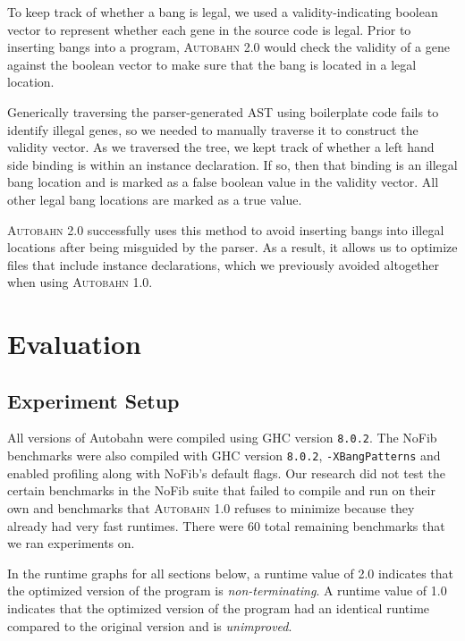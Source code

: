 \documentclass[format=sigplan, review=true]{acmart}
\newcommand{\Ao}[0]{\textsc{Autobahn 1.0}}
\newcommand{\At}[0]{\textsc{Autobahn 2.0}}
\newcommand{\nonterm}[0]{non-terminating}
\newcommand{\unimp}[0]{unimproved}
\begin{document}
To keep track of whether a bang is legal, we used a validity-indicating boolean vector to represent whether each gene in the source code is legal. Prior to inserting bangs into a program, \At{} would check the validity of a gene against the boolean vector to make sure that the bang is located in a legal location.

Generically traversing the parser-generated AST using boilerplate code fails to identify illegal genes, so we needed to manually traverse it to construct the validity vector. As we traversed the tree, we kept track of whether a left hand side binding is within an instance declaration. If so, then that binding is an illegal bang location and is marked as a false boolean value in the validity vector. All other legal bang locations are marked as a true value.

\At{} successfully uses this method to avoid inserting bangs into illegal locations after being misguided by the parser. As a result, it allows us to optimize files that include instance declarations, which we previously avoided altogether when using \Ao{}. 

\section{Evaluation}

\subsection{Experiment Setup}

All versions of Autobahn were compiled using GHC version \texttt{8.0.2}. The NoFib benchmarks were also compiled with GHC version \texttt{8.0.2}, \texttt{-XBangPatterns} and enabled profiling along with NoFib's default flags. Our research did not test the certain benchmarks in the NoFib suite that failed to compile and run on their own and benchmarks that \Ao{} refuses to minimize because they already had very fast runtimes. There were 60 total remaining benchmarks that we ran experiments on.

In the runtime graphs for all sections below, a runtime value of 2.0 indicates that the optimized version of the program is \textit{\nonterm{}}. A runtime value of 1.0 indicates that the optimized version of the program had an identical runtime compared to the original version and is \textit{\unimp{}}.
\end{document}
